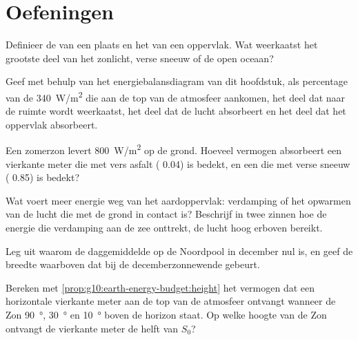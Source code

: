 \section{Oefeningen}

\begin{exercise}[$\star$]\label{exo:g10:earth-energy-budget:1}
Definieer de  van een plaats en het  van een oppervlak. Wat
weerkaatst het grootste deel van het zonlicht, verse sneeuw of de open oceaan?
\end{exercise}

\begin{exercise}[$\star$]\label{exo:g10:earth-energy-budget:2}
Geef met behulp van het energiebalansdiagram van dit hoofdstuk, als percentage
van de \qty{340}{W/m^2} die aan de top van de atmosfeer aankomen, het deel dat
naar de ruimte wordt weerkaatst, het deel dat de lucht absorbeert en het deel
dat het oppervlak absorbeert.
\end{exercise}

\begin{exercise}[$\star$]\label{exo:g10:earth-energy-budget:3}
Een zomerzon levert \qty{800}{W/m^2} op de grond. Hoeveel vermogen absorbeert
een vierkante meter die met vers asfalt ( 0.04) is bedekt, en een die met
verse sneeuw ( 0.85) is bedekt?
\end{exercise}

\begin{exercise}[$\star$]\label{exo:g10:earth-energy-budget:4}
Wat voert meer energie weg van het aardoppervlak: verdamping of het opwarmen van
de lucht die met de grond in contact is? Beschrijf in twee zinnen hoe de energie
die verdamping aan de zee onttrekt, de lucht hoog erboven bereikt.
\end{exercise}

\begin{exercise}[$\star$]\label{exo:g10:earth-energy-budget:5}
Leg uit waarom de daggemiddelde  op de Noordpool in december nul is,
en geef de breedte waarboven dat bij de decemberzonnewende gebeurt.
\end{exercise}

\begin{exercise}[$\star\star$]\label{exo:g10:earth-energy-budget:6}
Bereken met \cref{prop:g10:earth-energy-budget:height} het vermogen dat een
horizontale vierkante meter aan de top van de atmosfeer ontvangt wanneer de Zon
\qty{90}{\degree}, \qty{30}{\degree} en \qty{10}{\degree} boven de horizon staat.
Op welke hoogte van de Zon ontvangt de vierkante meter de helft van $S_0$?
\end{exercise}

